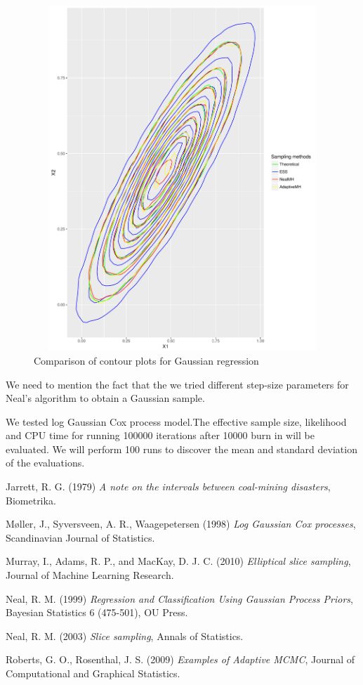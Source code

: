 \documentclass{article}
\begin{document}
\begin{figure}[h]\label{comparison}
\centering
\includegraphics[height=13cm,width = 15cm]{ComparisonGauss.pdf}
\caption{Comparison of contour plots for Gaussian regression}
\end{figure}
We need to mention the fact that the we tried different step-size parameters for Neal's algorithm to obtain a Gaussian sample.


We tested log Gaussian Cox process model.The effective sample size, likelihood and CPU time for running 100000 iterations after 10000 burn in will be evaluated. We will perform 100 runs to discover the mean and standard deviation of the evaluations. 


\begin{thebibliography}{12}


	Jarrett, R. G.  (1979)
	\emph{A note on the intervals between coal-mining disasters},
	Biometrika.

	M{\o}ller, J., Syversveen, A. R., Waagepetersen  (1998)
	\emph{Log Gaussian Cox processes},
	Scandinavian Journal of Statistics.

	Murray, I., Adams, R. P., and MacKay, D. J. C. (2010)
	\emph{Elliptical slice sampling},
	Journal of Machine Learning Research.
	
	Neal, R. M. (1999)
	\emph{Regression and Classification Using
Gaussian Process Priors},
	Bayesian Statistics 6 (475-501), OU Press.
	
	Neal, R. M. (2003)
	\emph{Slice sampling},
	Annals of Statistics.

	Roberts, G. O., Rosenthal, J. S. (2009)
	\emph{Examples of Adaptive MCMC},
	Journal of Computational and Graphical Statistics.

\end{thebibliography}
\end{document}
